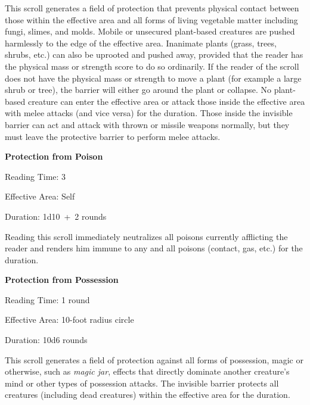 \begin{multicols}{2}
This scroll generates a field of protection that prevents physical contact between those within the effective area and all forms of living vegetable matter including fungi, slimes, and molds.  Mobile or unsecured plant-based creatures are pushed harmlessly to the edge of the effective area.  Inanimate plants (grass, trees, shrubs, etc.) can also be uprooted and pushed away, provided that the reader has the physical mass or strength score to do so ordinarily.  If the reader of the scroll does not have the physical mass or strength to move a plant (for example a large shrub or tree), the barrier will either go around the plant or collapse.  No plant-based creature can enter the effective area or attack those inside the effective area with melee attacks (and vice versa) for the duration.  Those inside the invisible barrier can act and attack with thrown or missile weapons normally, but they must leave the protective barrier to perform melee attacks.  

\vspace{1em}
\noindent \begin{minipage}{\columnwidth}

\noindent \textbf{Protection from Poison}

\noindent Reading Time: 3

\noindent Effective Area: Self

\noindent Duration: 1d10~+~2 rounds

\end{minipage}

Reading this scroll immediately neutralizes all poisons currently afflicting the reader and renders him immune to any and all poisons (contact, gas, etc.) for the duration.

\vspace{1em}
\noindent \begin{minipage}{\columnwidth}

\noindent \textbf{Protection from Possession}

\noindent Reading Time: 1 round

\noindent Effective Area: 10-foot radius circle

\noindent Duration: 10d6 rounds

\end{minipage}

This scroll generates a field of protection against all forms of possession, magic or otherwise, such as \textit{magic jar}, effects that directly dominate another creature's mind or other types of possession attacks.  The invisible barrier protects all creatures (including dead creatures) within the effective area for the duration.


\end{multicols}
